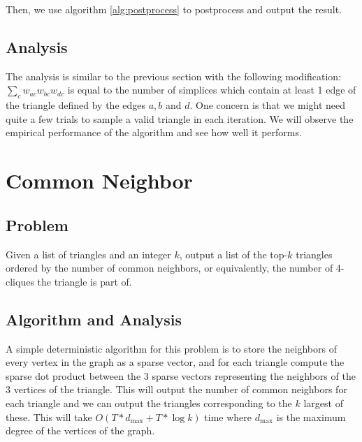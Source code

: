\documentclass{article}
\begin{document}
Then, we use algorithm \ref{alg:postprocess} to postprocess and output the result.


\subsection{Analysis}

The analysis is similar to the previous section with the following
modification: $\sum\limits_c w_{ac}w_{bc}w_{dc}$ is equal to the
number of simplices which contain at least 1 edge of the
triangle defined by the edges $a, b$ and $d$. One concern is that
we might need quite a few trials to sample a valid triangle in each
iteration. We will observe the empirical performance of the algorithm
and see how well it performs.


\section{Common  Neighbor}

\subsection{Problem}

Given a list of triangles and an integer $k$,
output a list of the top-$k$ triangles ordered
by the number of common  neighbors, or
equivalently, the number of 4-cliques the 
triangle is part of.  


\subsection{Algorithm and Analysis}

A simple deterministic algorithm for this 
problem is to store the neighbors of every
vertex in the graph as a sparse vector, and
for each triangle compute the sparse dot product
between the 3 sparse vectors representing the 
neighbors of the 3 vertices of the triangle.
This will output the number of common 
neighbors for each triangle and we can output
the triangles corresponding to the $k$ largest
of these. This will take $O(T * d_{\text{max}} + T * 
\log{k})$ time where $d_{\text{max}}$ is the maximum 
degree of the vertices of the graph.
\end{document}

